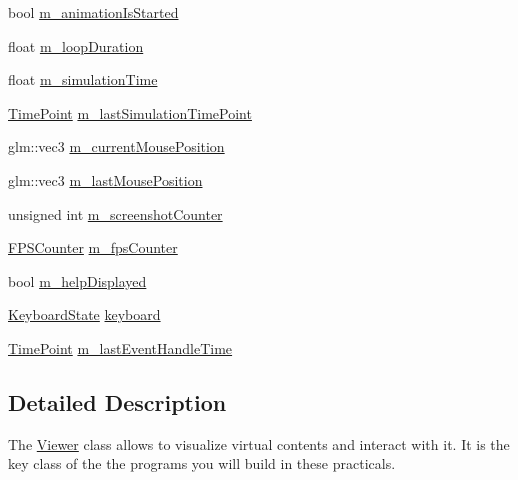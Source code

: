 \begin{DoxyCompactItemize}
bool \hyperlink{classViewer_af77f428d66cb515b77774efd36846ce2}{m\+\_\+animation\+Is\+Started}
\item 
float \hyperlink{classViewer_a361b307d72d4647b895b0c35d6b3a3a9}{m\+\_\+loop\+Duration}
\item 
float \hyperlink{classViewer_a26701da64fd533bbadd7a20bb2bddb4b}{m\+\_\+simulation\+Time}
\item 
\hyperlink{classViewer_ae3f3e7a7694a354a2d374693649000ec}{Time\+Point} \hyperlink{classViewer_ac20ec408b4ae6ab2b1e0a42d04be4acf}{m\+\_\+last\+Simulation\+Time\+Point}
\item 
glm\+::vec3 \hyperlink{classViewer_a0bdff57aff91916b2fa3e239d474ab53}{m\+\_\+current\+Mouse\+Position}
\item 
glm\+::vec3 \hyperlink{classViewer_a345d4a077878ba4b991a90e4147c08c5}{m\+\_\+last\+Mouse\+Position}
\item 
unsigned int \hyperlink{classViewer_a54b354f885ad35e9bf2d33e80ae32e8d}{m\+\_\+screenshot\+Counter}
\item 
\hyperlink{classFPSCounter}{F\+P\+S\+Counter} \hyperlink{classViewer_a837a1d9dcf94c41c637e931989261554}{m\+\_\+fps\+Counter}
\item 
bool \hyperlink{classViewer_acbbda7f59919b475ae7e20b78118aebb}{m\+\_\+help\+Displayed}
\item 
\hyperlink{structViewer_1_1KeyboardState}{Keyboard\+State} \hyperlink{classViewer_a0c8e2d656c33435015ce34b06e047e77}{keyboard}
\item 
\hyperlink{classViewer_ae3f3e7a7694a354a2d374693649000ec}{Time\+Point} \hyperlink{classViewer_a2f18581a08d0449876631f30c2e9606a}{m\+\_\+last\+Event\+Handle\+Time}
\end{DoxyCompactItemize}


\subsection{Detailed Description}
The \hyperlink{classViewer}{Viewer} class allows to visualize virtual contents and interact with it. It is the key class of the the programs you will build in these practicals. 

